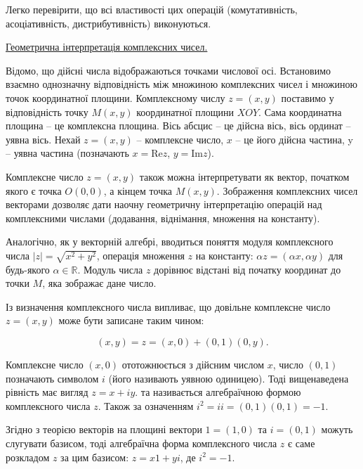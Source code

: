 Легко перевірити, що всі властивості цих операцій (комутативність,
асоціативність, дис\-три\-бу\-тив\-ність) виконуються.

\underline{Геометрична інтерпретація комплексних чисел.}

Відомо, що дійсні числа відображаються точками числової осі. Встановимо
взаємно однозначну відповідність між множиною комплексних чисел і множиною
точок координатної площини. Комплексному числу $z = (x,y)$ поставимо у
відповідність точку $M(x,y)$ координатної площини $XOY$. Сама координатна
площина -- це комплексна площина. Вісь абсцис -- це дійсна
вісь, вісь ординат -- уявна вісь. Нехай $z = (x,y)$ -- комплексне число, $x$ -- це
його дійсна частина, y – уявна частина (позначають $x = \text{Re}z$, $y = \text{Im}z$).

Комплексне число $z = (x,y)$ також можна інтерпретувати як вектор, початком
якого є точка $O(0,0)$, а кінцем точка $M(x,y)$. Зображення комплексних чисел
векторами дозволяє дати наочну геометричну інтерпретацію операцій над
комплексними числами (додавання, віднімання, множення на константу).

Аналогічно, як у векторній алгебрі, вводиться поняття модуля комплексного
числа $|z| = \sqrt{x^2 + y^2}$, операція множення $z$ на константу: $\alpha z = (\alpha x,\alpha y)$ для
будь-якого $\alpha \in \mathbb{R}$. Модуль числа $z$ дорівнює відстані від початку координат до
точки $M$, яка зображає дане число.

Із визначення комплексного числа випливає, що довільне комплексне число
$z = (x,y)$ може бути записане таким чином:

$$(x,y) = z = (x,0) + (0,1)(0,y).$$

Комплексне число $(x,0)$ ототожнюється з дійсним числом $x$, число $(0, 1)$
позначають символом $i$ (його називають уявною одиницею). Тоді вищенаведена
рівність має вигляд $z = x + iy$. та називається алгебраїчною формою комплексного
числа $z$. Також за означенням $i^2 = ii = (0,1)(0,1) = -1$.

\parbox{3cm}{}
\parbox{9cm}{
	Згідно з теорією векторів на площині
	вектори $1=(1,0)$ та $i = (0,1)$ можуть
	слугувати базисом, тоді алгебраїчна форма
	комплексного числа $z$ є саме розкладом $z$
	за цим базисом: $z = x1 + yi$, де $i^2 = -1$.
}

